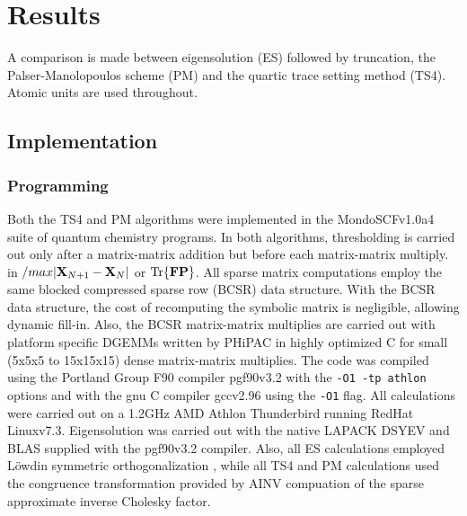 \commentoutA{\documentclass[prb,aps,twocolumn,twocolumngrid,secnumarabic,superbib,hyperref]{revtex4}}
\begin{document}
\section{Results}

A comparison is made between eigensolution (ES) followed by truncation, the 
Palser-Manolopoulos scheme (PM) \cite{Palser98} and the quartic trace setting method (TS4).  
Atomic units are used throughout. 

\subsection{Implementation}

\subsubsection{Programming}
Both the TS4 and PM algorithms were implemented in the {\sc MondoSCF}v1.0a4 suite of 
quantum chemistry programs\cite{MondoSCF}.  In both algorithms, thresholding is carried out 
only after a matrix-matrix addition but before each matrix-matrix multiply.  
in  $/max |{\bf X}_{N+1}-{\bf X}_N|$ or ${\rm Tr}\{{\bf F P} \}$. 
All sparse matrix computations employ the same blocked compressed sparse row 
(BCSR)\cite{MChallacombe99,MChallacombe00} 
data structure.  With the BCSR data structure, the cost of recomputing the symbolic 
matrix is negligible, allowing dynamic fill-in.  Also, the BCSR matrix-matrix multiplies 
are carried out with platform specific {\sc DGEMM}s written by  
{\sc PHiPAC} \cite{JBilmes96a,JBilmes97b,PHiPAC} in highly optimized C for small 
(5x5x5 to 15x15x15) dense matrix-matrix multiplies.  The code was compiled using the 
Portland Group F90 compiler {\sc pgf90}v3.2 \cite{pgf90} with the {\tt -O1 -tp athlon} 
options  and with the gnu C compiler {\sc gcc}v2.96 using the {\tt -O1} flag.  All 
calculations were carried out on a 1.2GHz AMD Athlon Thunderbird running RedHat 
{\sc Linux}v7.3\cite{RedHat73}.  Eigensolution was carried out with the native
{\sc LAPACK} \cite{LAPACK} {\sc DSYEV} and {\sc BLAS} supplied with the {\sc pgf90}v3.2 compiler.
Also, all ES calculations employed L{\"o}wdin symmetric orthogonalization \cite{PLowdin50}, 
while all TS4 and PM calculations used the congruence transformation provided by
AINV \cite{MChallacombe02c} compuation of the sparse approximate inverse Cholesky factor.
\end{document}
